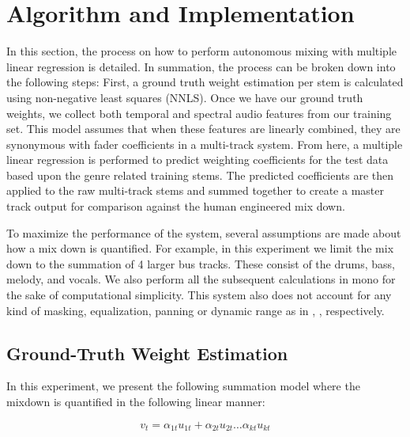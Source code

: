 \documentclass{article}
\begin{document}
\section{Algorithm and Implementation}
\label{sec:Algorithm and Implementation}

In this section, the process on how to perform autonomous mixing with multiple linear regression is detailed.  In summation, the process can be broken down into the following steps: First, a ground truth weight estimation per stem is calculated using non-negative least squares (NNLS).  Once we have our ground truth weights, we collect both temporal and spectral audio features from our training set.  This model assumes that when these features are linearly combined, they are synonymous with fader coefficients in a multi-track system.  From here, a multiple linear regression is performed to predict weighting coefficients for the test data based upon the genre related training stems.  The predicted coefficients are then applied to the raw multi-track stems and summed together to create a master track output for comparison against the human engineered mix down.

To maximize the performance of the system, several assumptions are made about how a mix down is quantified.  For example, in this experiment we limit the mix down to the summation of 4 larger bus tracks.  These consist of the drums, bass, melody, and vocals.  We also perform all the subsequent calculations in mono for the sake of computational simplicity.  This system also does not account for any kind of masking, equalization, panning or dynamic range as in \cite{mansbridge2012implementation}, \cite{ma2013implementation}, \cite{vickers2001automatic} respectively.

\subsection{Ground-Truth Weight Estimation}
\label{subsec:Ground-Truth Weight Estimation}

In this experiment, we present the following summation model where the mixdown is quantified in the following linear manner:

\begin{equation}
\label{eq:System Equation}
v_t = \alpha_{1t}u_{1t} + \alpha_{2t}u_{2t} \dots \alpha_{kt}u_{kt}
\end{equation}
\end{document}

